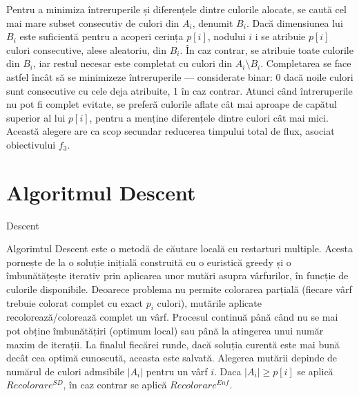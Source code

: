 Pentru a minimiza întreruperile și diferențele dintre culorile alocate, se caută cel mai mare subset consecutiv de culori din $A_i$, denumit $B_i$. Dacă dimensiunea lui $B_i$ este suficientă pentru a acoperi cerința $p[i]$, nodului $i$ i se atribuie $p[i]$ culori consecutive, alese aleatoriu, din $B_i$. În caz contrar, se atribuie toate culorile din $B_i$, iar restul necesar este completat cu culori din $A_i \setminus B_i$. Completarea se face astfel încât să se minimizeze întreruperile — considerate binar: 0 dacă noile culori sunt consecutive cu cele deja atribuite, 1 în caz contrar. Atunci când întreruperile nu pot fi complet evitate, se preferă culorile aflate cât mai aproape de capătul superior al lui $p[i]$, pentru a menține diferențele dintre culori cât mai mici. Această alegere are ca scop secundar reducerea timpului total de flux, asociat obiectivului $f_3$.



\section{Algoritmul Descent}
\begin{algorithm}[H]
\caption{Descent}\label{alg:descent_multicoloring}
\begin{algorithmic}[1]
\small
{}
        \Else{}
        \EndIf{}
    \EndFor{}
    \EndIf{}
\EndWhile{}
\EndWhile{}
\end{algorithmic}
\end{algorithm}
Algorimtul Descent  este o metodă de căutare locală cu restarturi multiple. Acesta pornește de la o soluție inițială construită cu o euristică greedy și o îmbunătățește iterativ prin aplicarea unor mutări asupra vârfurilor, în funcție de culorile disponibile. Deoarece problema nu permite colorarea parțială (fiecare vârf trebuie colorat complet cu exact $p_i$ culori), mutările aplicate recolorează/colorează complet un vârf. Procesul continuă până când nu se mai pot obține îmbunătățiri (optimum local) sau până la atingerea unui număr maxim de iterații. La finalul fiecărei runde, dacă soluția curentă este mai bună decât cea optimă cunoscută, aceasta este salvată. Alegerea mutării depinde de numărul de culori admsibile $|A_i|$ pentru un vârf $i$. Daca $|A_i| \geq p[i]$ se aplică $Recolorare^{SD}$, în caz contrar se aplică $Recolorare^{Enf}$.

